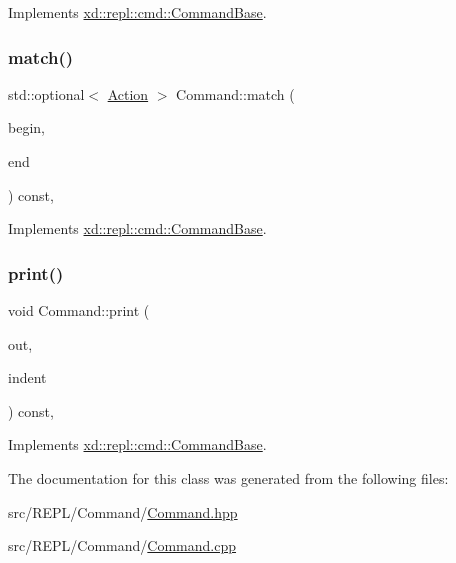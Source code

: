 Implements \mbox{\hyperlink{classxd_1_1repl_1_1cmd_1_1_command_base_a38bae861ceff52dfd3efa19aefbc3971}{xd\+::repl\+::cmd\+::\+Command\+Base}}.

\mbox{\label{classxd_1_1repl_1_1cmd_1_1_command_ae36dbba2be732b38ebdac47c504fe91d}} 
\subsubsection{\texorpdfstring{match()}{match()}}
{\footnotesize\ttfamily std\+::optional$<$ \mbox{\hyperlink{namespacexd_1_1repl_1_1cmd_a7274841bd02a9c5da0ba48ae204ab3d5}{Action}} $>$ Command\+::match (\begin{DoxyParamCaption}\item[{std\+::string\+::const\+\_\+iterator}]{begin,  }\item[{std\+::string\+::const\+\_\+iterator}]{end }\end{DoxyParamCaption}) const\hspace{0.3cm}{\ttfamily [override]}, {\ttfamily [virtual]}}



Implements \mbox{\hyperlink{classxd_1_1repl_1_1cmd_1_1_command_base_adc60ebee9e6b13fd4e9305bd436555ee}{xd\+::repl\+::cmd\+::\+Command\+Base}}.

\mbox{\label{classxd_1_1repl_1_1cmd_1_1_command_ae10301038c77c9226c6bb6c7c0ad85c8}} 
\subsubsection{\texorpdfstring{print()}{print()}}
{\footnotesize\ttfamily void Command\+::print (\begin{DoxyParamCaption}\item[{std\+::ostream \&}]{out,  }\item[{\mbox{\hyperlink{classxd_1_1util_1_1_indent_helper}{xd\+::util\+::\+Indent\+Helper}} \&}]{indent }\end{DoxyParamCaption}) const\hspace{0.3cm}{\ttfamily [override]}, {\ttfamily [virtual]}}



Implements \mbox{\hyperlink{classxd_1_1repl_1_1cmd_1_1_command_base_acb731ef346c5c1eccce3c88749fed8e8}{xd\+::repl\+::cmd\+::\+Command\+Base}}.



The documentation for this class was generated from the following files\+:\begin{DoxyCompactItemize}
\item 
src/\+R\+E\+P\+L/\+Command/\mbox{\hyperlink{_command_8hpp}{Command.\+hpp}}\item 
src/\+R\+E\+P\+L/\+Command/\mbox{\hyperlink{_command_8cpp}{Command.\+cpp}}\end{DoxyCompactItemize}
